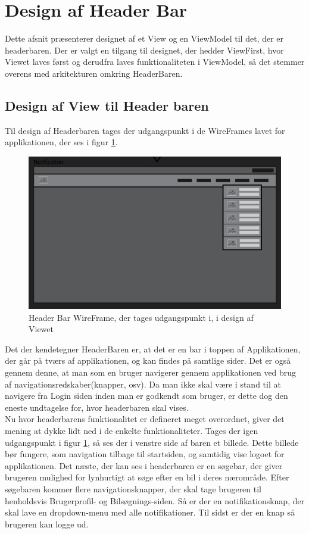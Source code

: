 \documentclass[SoftwareDesign/SoftwareDesign_main.tex]{subfiles}
\begin{document}
\section{Design af Header Bar}
Dette afsnit præsenterer designet af et View og en ViewModel til det, der er headerbaren. Der er valgt en tilgang til designet, der hedder ViewFirst, hvor Viewet laves først og derudfra laves funktionaliteten i ViewModel, så det stemmer overens med arkitekturen omkring HeaderBaren.
\subsection{Design af View til Header baren}
Til design af Headerbaren tages der udgangspunkt i de WireFrames lavet for applikationen, der ses i figur \ref{fig:headerbar_wf}. 
\begin{figure}[H]
    \centering
    \includegraphics[width=\textwidth]{SoftwareDesign/MVVMDesigns/Graphics/HeaderBarWireFrame.png}
    \caption{Header Bar WireFrame, der tages udgangspunkt i, i design af Viewet}
    \label{fig:headerbar_wf}
\end{figure}
Det der kendetegner HeaderBaren er, at det er en bar i toppen af Applikationen, der går på tværs af applikationen, og kan findes på samtlige sider. Det er også gennem denne, at man som en bruger navigerer gennem applikationen ved brug af navigationsredskaber(knapper, osv). Da man ikke skal være i stand til at navigere fra Login siden inden man er godkendt som bruger, er dette dog den eneste undtagelse for, hvor headerbaren skal vises.\\

Nu hvor headerbarens funktionalitet er defineret meget overordnet, giver det mening at dykke lidt ned i de enkelte funktionaliteter. Tages der igen udgangspunkt i figur \ref{fig:headerbar_wf}, så ses der i venstre side af baren et billede. Dette billede bør fungere, som navigation tilbage til startsiden, og samtidig vise logoet for applikationen. Det næste, der kan ses i headerbaren er en søgebar, der giver brugeren mulighed for lynhurtigt at søge efter en bil i deres nærområde. Efter søgebaren kommer flere navigationsknapper, der skal tage brugeren til henholdsvis Brugerprofil- og Bilsøgnings-siden. Så er der en notifikationsknap, der skal lave en dropdown-menu med alle notifikationer. Til sidst er der en knap så brugeren kan logge ud.
\end{document}

